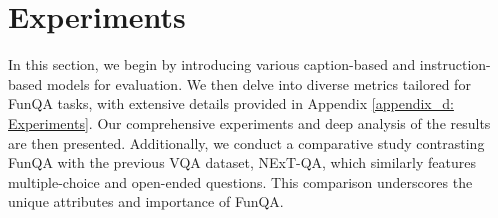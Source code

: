 \section{Experiments}
In this section, we begin by introducing various caption-based and instruction-based models for evaluation. We then delve into diverse metrics tailored for FunQA tasks, with extensive details provided in Appendix \ref{appendix_d: Experiments}. Our comprehensive experiments and deep analysis of the results are then presented. Additionally, we conduct a comparative study contrasting FunQA with the previous VQA dataset, NExT-QA, which similarly features multiple-choice and open-ended questions. This comparison underscores the unique attributes and importance of FunQA.


